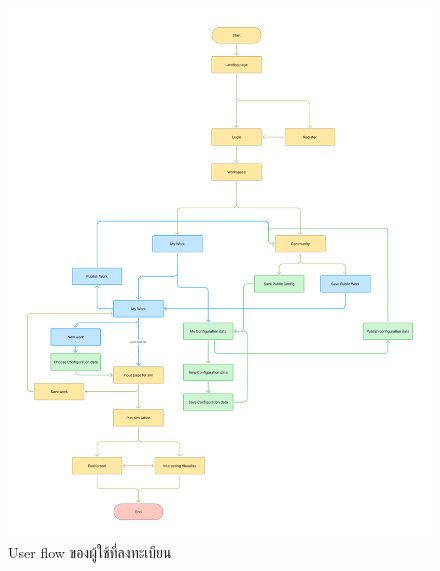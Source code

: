 \begin{mypara}
\begin{itemize}
\begin{figure}[H]
    \centering
    \includegraphics[width=\textwidth,height=0.9\textheight,keepaspectratio]{User_flow_-_login.png}
    \caption{User flow ของผู้ใช้ที่ลงทะเบียน}
    \label{fig:UserFlowRegistered}
    \end{figure}
    

\end{itemize}
\end{mypara}
\newpage

